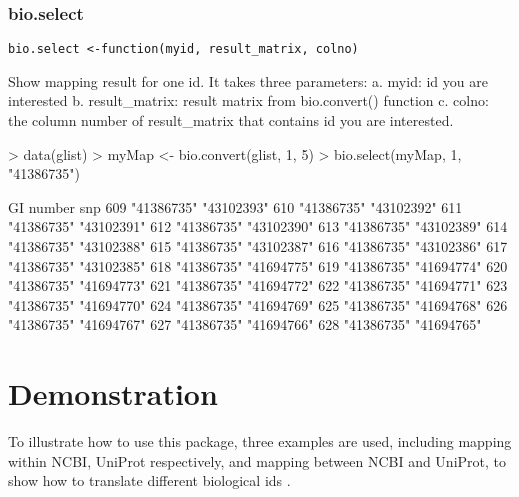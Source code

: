 \documentclass[a4paper]{article}
\begin{document}
\subsubsection{bio.select}
\begin{verbatim}
bio.select <-function(myid, result_matrix, colno)
\end{verbatim}
Show mapping result for one id.
It takes three parameters: \newline
a. myid: id you are interested\newline
b. result\_matrix: result matrix from bio.convert() function\newline
c. colno: the column number of result\_matrix that contains id you are interested.\newline

\begin{Schunk}
\begin{Sinput}
> data(glist)
> myMap <- bio.convert(glist, 1, 5)
> bio.select(myMap, 1, "41386735")
\end{Sinput}
\begin{Soutput}
    GI number  snp       
609 "41386735" "43102393"
610 "41386735" "43102392"
611 "41386735" "43102391"
612 "41386735" "43102390"
613 "41386735" "43102389"
614 "41386735" "43102388"
615 "41386735" "43102387"
616 "41386735" "43102386"
617 "41386735" "43102385"
618 "41386735" "41694775"
619 "41386735" "41694774"
620 "41386735" "41694773"
621 "41386735" "41694772"
622 "41386735" "41694771"
623 "41386735" "41694770"
624 "41386735" "41694769"
625 "41386735" "41694768"
626 "41386735" "41694767"
627 "41386735" "41694766"
628 "41386735" "41694765"
\end{Soutput}
\end{Schunk}

\section{Demonstration}

To illustrate how to use this package, three examples are used, including mapping within NCBI, UniProt respectively, and mapping between NCBI and UniProt, to show how to translate different biological ids .
\end{document}
